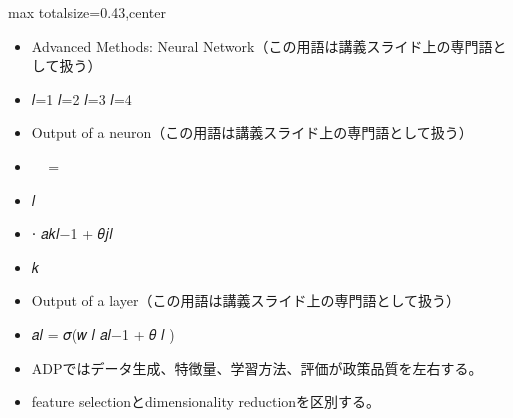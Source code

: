 \clearpage
{}
\begin{minipage}[t]{0.405\textwidth}
\begin{adjustbox}{max totalsize={\textwidth}{0.43\textheight},center}
\begin{minipage}{\textwidth}\scriptsize
{}\begin{itemize}
\item Advanced Methods: Neural Network（この用語は講義スライド上の専門語として扱う）
\item 𝑙=1 𝑙=2 𝑙=3 𝑙=4
\item Output of a neuron（この用語は講義スライド上の専門語として扱う）
\item 𝑎𝑗𝑙 = 𝜎 ෍ 𝑤𝑗𝑘
\item 𝑙
\item ⋅ 𝑎𝑘𝑙−1 + 𝜃𝑗𝑙
\item 𝑘
\item Output of a layer（この用語は講義スライド上の専門語として扱う）
\item 𝑎𝑙 = 𝜎(𝑤 𝑙 𝑎𝑙−1 + 𝜃 𝑙 )
\end{itemize}\begin{itemize}
\item ADPではデータ生成、特徴量、学習方法、評価が政策品質を左右する。
\item feature selectionとdimensionality reductionを区別する。
\end{itemize}
\end{minipage}
\end{adjustbox}
\end{minipage}\hfill
